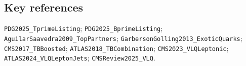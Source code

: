 \subsection*{Key references}
\texttt{PDG2025\_TprimeListing};
\texttt{PDG2025\_BprimeListing};
\texttt{AguilarSaavedra2009\_TopPartners};
\texttt{GarbersonGolling2013\_ExoticQuarks};
\texttt{CMS2017\_TBBoosted};
\texttt{ATLAS2018\_TBCombination};
\texttt{CMS2023\_VLQLeptonic};
\texttt{ATLAS2024\_VLQLeptonJets};
\texttt{CMSReview2025\_VLQ}.
